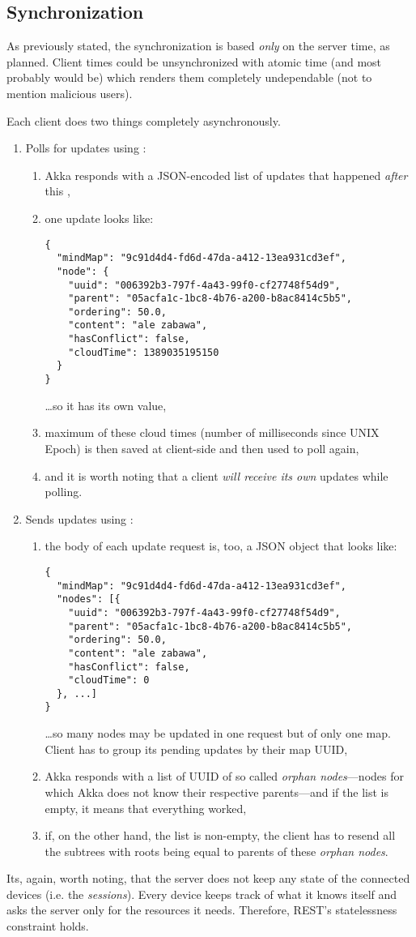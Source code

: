 \subsection{Synchronization}
\label{subsection:akka-synchro}
As previously stated, the synchronization is based \emph{only} on the server time, as planned. Client times could be unsynchronized with atomic time (and most probably would be) which renders them completely undependable (not to mention malicious users).

Each client does two things completely asynchronously.

\begin{enumerate}
	\item Polls for updates using : \begin{enumerate}
		\item Akka responds with a JSON-encoded list of updates that happened \emph{after} this ,
		\item one update looks like:\begin{verbatim}
{
  "mindMap": "9c91d4d4-fd6d-47da-a412-13ea931cd3ef",
  "node": {
    "uuid": "006392b3-797f-4a43-99f0-cf27748f54d9",
    "parent": "05acfa1c-1bc8-4b76-a200-b8ac8414c5b5",
    "ordering": 50.0,
    "content": "ale zabawa",
    "hasConflict": false,
    "cloudTime": 1389035195150
  }
}
		\end{verbatim}\ldots so it has its own  value,
		\item maximum of these cloud times (number of milliseconds since UNIX Epoch) is then saved at client-side and then used to poll again,
		\item and it is worth noting that a client \emph{will receive its own} updates while polling.
	\end{enumerate}
	\item Sends updates using : \begin{enumerate}
		\item the body of each update request is, too, a JSON object that looks like:\begin{verbatim}
{
  "mindMap": "9c91d4d4-fd6d-47da-a412-13ea931cd3ef",
  "nodes": [{
    "uuid": "006392b3-797f-4a43-99f0-cf27748f54d9",
    "parent": "05acfa1c-1bc8-4b76-a200-b8ac8414c5b5",
    "ordering": 50.0,
    "content": "ale zabawa",
    "hasConflict": false,
    "cloudTime": 0
  }, ...]
}
		\end{verbatim} \ldots so many nodes may be updated in one request but of only one map. Client has to group its pending updates by their map UUID,
		\item Akka responds with a list of UUID of so called \emph{orphan nodes}---nodes for which Akka does not know their respective parents---and if the list is empty, it means that everything worked,
		\item if, on the other hand, the list is non-empty, the client has to resend all the subtrees with roots being equal to parents of these \emph{orphan nodes}.
	\end{enumerate}
\end{enumerate}

Its, again, worth noting, that the server does not keep any state of the connected devices (i.e. the \emph{sessions}). Every device keeps track of what it knows itself and asks the server only for the resources it needs. Therefore, REST's statelessness constraint holds.

